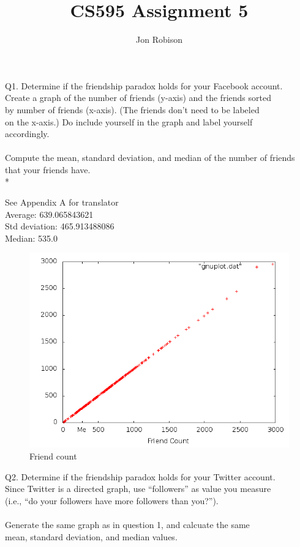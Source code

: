 \documentclass{article}
\begin{document}
\author{Jon Robison}
\title{CS595 Assignment 5}
\maketitle

Q1.  Determine if the friendship paradox holds for your Facebook account.\\
Create a graph of the number of friends (y-axis) and the friends sorted\\
by number of friends (x-axis).  (The friends don't need to be labeled \\
on the x-axis.)  Do include yourself in the graph and label yourself\\
accordingly.\\
\\
Compute the mean, standard deviation, and median of the number of friends\\
that your friends have. \\*

See Appendix A for translator\\
Average: 639.065843621 \\
Std deviation: 465.913488086 \\
Median: 535.0 \\
\graphicspath{{q1/}}
\begin{figure}
  \centering
  \caption{Friend count}
  \includegraphics[scale=.3]{scatter.png}
\end{figure}
\clearpage

Q2. Determine if the friendship paradox holds for your Twitter account.\\
Since Twitter is a directed graph, use ``followers'' as value you measure\\
(i.e., ``do your followers have more followers than you?'').\\
\\
Generate the same graph as in question 1, and calcuate the same \\
mean, standard deviation, and median values.\\
\end{document}
